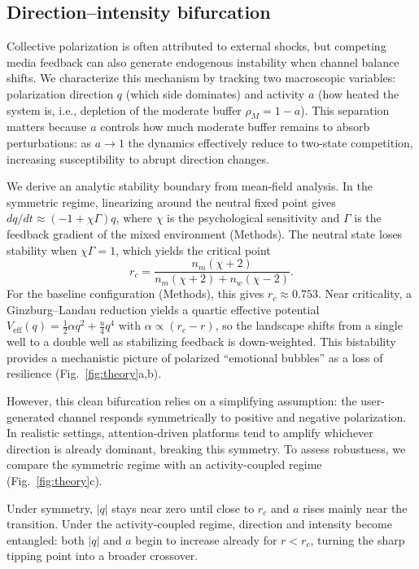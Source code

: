 \documentclass[12pt]{article}
\begin{document}
\subsection{Direction--intensity bifurcation}
\label{sec:direction-intensity-bifurcation}
Collective polarization is often attributed to external shocks, but competing media feedback can also generate endogenous instability when channel balance shifts. We characterize this mechanism by tracking two macroscopic variables: polarization direction $q$ (which side dominates) and activity $a$ (how heated the system is, i.e., depletion of the moderate buffer $\rho_M=1-a$). This separation matters because $a$ controls how much moderate buffer remains to absorb perturbations: as $a\to 1$ the dynamics effectively reduce to two-state competition, increasing susceptibility to abrupt direction changes.

We derive an analytic stability boundary from mean-field analysis. In the symmetric regime, linearizing around the neutral fixed point gives $dq/dt\approx(-1+\chi\Gamma)q$, where $\chi$ is the psychological sensitivity and $\Gamma$ is the feedback gradient of the mixed environment (Methods). The neutral state loses stability when $\chi\Gamma=1$, which yields the critical point
\begin{equation}
r_c=\frac{n_m(\chi+2)}{n_m(\chi+2)+n_w(\chi-2)}.
\label{eq:rc}
\end{equation}
For the baseline configuration (Methods), this gives $r_c\approx 0.753$. Near criticality, a Ginzburg--Landau reduction yields a quartic effective potential $V_{\text{eff}}(q)=\tfrac{1}{2}\alpha q^2+\tfrac{u}{4}q^4$ with $\alpha\propto(r_c-r)$, so the landscape shifts from a single well to a double well as stabilizing feedback is down-weighted. This bistability provides a mechanistic picture of polarized ``emotional bubbles'' as a loss of resilience (Fig.~\ref{fig:theory}a,b).

However, this clean bifurcation relies on a simplifying assumption: the user-generated channel responds symmetrically to positive and negative polarization. In realistic settings, attention-driven platforms tend to amplify whichever direction is already dominant, breaking this symmetry. To assess robustness, we compare the symmetric regime with an activity-coupled regime (Fig.~\ref{fig:theory}c).

Under symmetry, $|q|$ stays near zero until close to $r_c$ and $a$ rises mainly near the transition. Under the activity-coupled regime, direction and intensity become entangled: both $|q|$ and $a$ begin to increase already for $r<r_c$, turning the sharp tipping point into a broader crossover.
\end{document}
